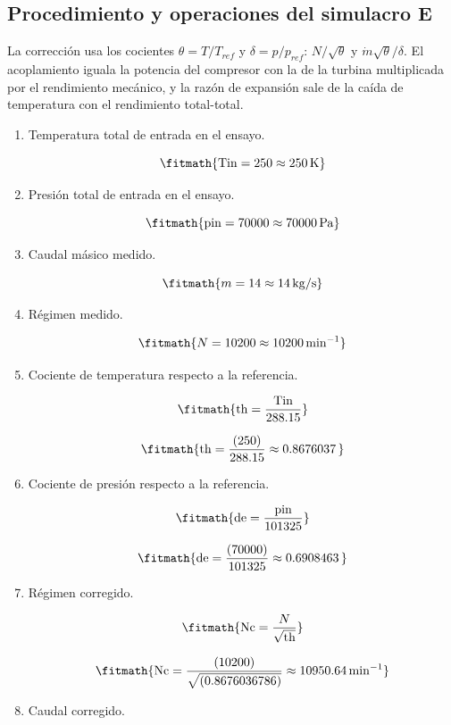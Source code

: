 \subsection*{Procedimiento y operaciones del simulacro E}
La corrección usa los cocientes $\theta=T/T_{ref}$ y $\delta=p/p_{ref}$: $N/\sqrt\theta$ y $\dot m\sqrt\theta/\delta$. El acoplamiento iguala la potencia del compresor con la de la turbina multiplicada por el rendimiento mecánico, y la razón de expansión sale de la caída de temperatura con el rendimiento total-total.

\begin{enumerate}

\item Temperatura total de entrada en el ensayo.

\[\fitmath{\mathrm{Tin}=250\approx 250\,\mathrm{K}}\]

\item Presión total de entrada en el ensayo.

\[\fitmath{\mathrm{pin}=70000\approx 70000\,\mathrm{Pa}}\]

\item Caudal másico medido.

\[\fitmath{m=14\approx 14\,\mathrm{kg/s}}\]

\item Régimen medido.

\[\fitmath{N=10200\approx 10200\,\mathrm{min^{-1}}}\]

\item Cociente de temperatura respecto a la referencia.

\[\fitmath{\mathrm{th}=\frac{\mathrm{Tin}}{288.15}}\]

\[\fitmath{\mathrm{th}=\frac{(250)}{288.15}\approx 0.8676037\,}\]

\item Cociente de presión respecto a la referencia.

\[\fitmath{\mathrm{de}=\frac{\mathrm{pin}}{101325}}\]

\[\fitmath{\mathrm{de}=\frac{(70000)}{101325}\approx 0.6908463\,}\]

\item Régimen corregido.

\[\fitmath{\mathrm{Nc}=\frac{N}{\sqrt{\mathrm{th}}}}\]

\[\fitmath{\mathrm{Nc}=\frac{(10200)}{\sqrt{(0.8676036786)}}\approx 10950.64\,\mathrm{min^{-1}}}\]

\item Caudal corregido.


\end{enumerate}
